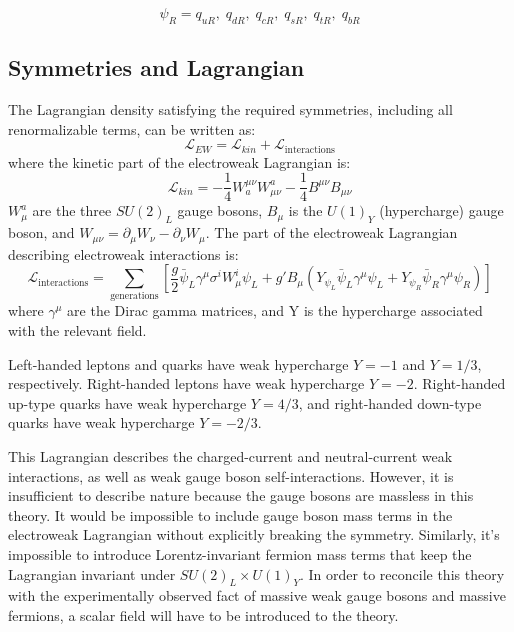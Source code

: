 \begin{equation}\label{eq:right_handed_quarks}
\psi_R = q_{uR},\; q_{dR},\; q_{cR},\; q_{sR},\; q_{tR},\; q_{bR}
\end{equation}

\subsection{Symmetries and Lagrangian}\label{subsec:ew_lagrangian}

The Lagrangian density satisfying the required symmetries, including all renormalizable terms, can be written as:
\begin{equation}\label{eq:ew_lagrangian}
    \mathcal{L}_{EW} = \mathcal{L}_{kin} + \mathcal{L}_{\text{interactions}}
\end{equation}
where the kinetic part of the electroweak Lagrangian is:
\begin{equation}\label{eq:ew_kin}
    \mathcal{L}_{kin} = -\frac{1}{4}W^{\mu \nu}_{a}W_{\mu \nu}^{a}-\frac{1}{4}B^{\mu \nu}B_{\mu \nu}
\end{equation}
$W_\mu^a$ are the three $SU(2)_L$ gauge bosons, $B_\mu$ is the $U(1)_Y$ (hypercharge) gauge boson, and $W_{\mu\nu} = \partial_{\mu} W_{\nu} - \partial_{\nu} W_{\mu}$.
The part of the electroweak Lagrangian describing electroweak interactions is:
\begin{equation}\label{eq:ew_int}
    \mathcal{L}_{\text{interactions}} = \sum_{\text{generations}}\left[\frac{g}{2}\bar{\psi}_{L}\gamma^\mu\sigma^i W_\mu^i \psi_L+
    g'B_\mu\left(Y_{\psi_L}\bar{\psi}_L\gamma^\mu\psi_L + Y_{\psi_R}\bar{\psi}_R\gamma^\mu \psi_R\right)\right]
\end{equation}
where $\gamma^\mu$ are the Dirac gamma matrices, and Y is the hypercharge associated with the relevant field.

Left-handed leptons and quarks have weak hypercharge $Y = -1$ and $Y = 1/3$, respectively.
Right-handed leptons have weak hypercharge $Y = -2$. Right-handed up-type quarks have weak hypercharge $Y = 4/3$,
and right-handed down-type quarks have weak hypercharge $Y = -2/3$.

This Lagrangian describes the charged-current and neutral-current weak interactions, as well as weak gauge boson self-interactions.
However, it is insufficient to describe nature because the gauge bosons are massless in this theory.
It would be impossible to include gauge boson mass terms in the electroweak Lagrangian without explicitly breaking the symmetry.
Similarly, it's impossible to introduce Lorentz-invariant fermion mass terms that keep the Lagrangian invariant under $SU(2)_L \times U(1)_Y$.
In order to reconcile this theory with the experimentally observed fact of massive weak gauge bosons and massive fermions, a scalar field will have to be introduced to the theory.

